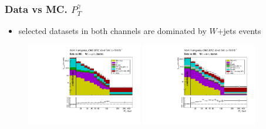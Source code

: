 \begin{frame}\frametitle{Data vs MC. $P_T^{\gamma}$}
\scriptsize
\begin{itemize}
   \item selected datasets in both channels are dominated by $W$+jets events
\end{itemize}
  \begin{figure}[htb]
    \begin{center}
       \includegraphics[width=0.45\textwidth]{../figs/figs_v11/MUON_WGamma/PrepareYields/c_TotalDATAvsMC_Barrel__phoEt.pdf} \includegraphics[width=0.45\textwidth]{../figs/figs_v11/ELECTRON_WGamma/PrepareYields/c_TotalDATAvsMC_Barrel__phoEt.pdf} 
    \end{center}
  \end{figure}
\end{frame}
